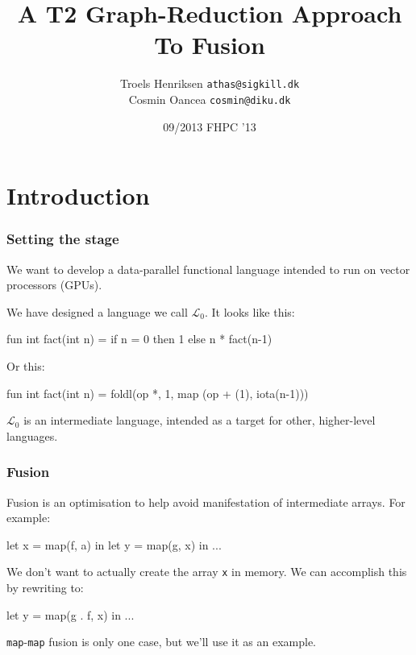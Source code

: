 \documentclass{beamer}
\title{A T2 Graph-Reduction Approach To Fusion}
\author[T.Henriksen,C.Oancea]{Troels Henriksen {\tt athas@sigkill.dk}\\Cosmin Oancea {\tt cosmin@diku.dk}}
\institute{Department of Computer Science (DIKU)\\University of Copenhagen}
\date[09/23]{09/2013 \textsc{FHPC} '13}
\newcommand{\LO}{$\mathcal{L}_0$}
\begin{document}
\titleslide

\begin{frame}[fragile]
  \tableofcontents
\end{frame}



\section{Introduction}

\begin{frame}[fragile,t]
  \frametitle{Setting the stage}

  We want to develop a data-parallel functional language intended to
  run on vector processors (GPUs).

  \pause

  We have designed a language we call \LO{}.  It looks like this:

  \begin{colorcode}
    fun int fact(int n) =
      if n = 0 then 1 else n * fact(n-1)
  \end{colorcode}

\pause

  Or this:

  \begin{colorcode}
    fun int fact(int n) =
      foldl(op *, 1, map (op + (1), iota(n-1)))
  \end{colorcode}

  \LO{} is an intermediate language, intended as a target for other,
  higher-level languages.
\end{frame}

\begin{frame}[fragile,t]
  \frametitle{Fusion}

  Fusion is an optimisation to help avoid manifestation of
  intermediate arrays.  For example:

  \begin{colorcode}
    let x = map(f, a) in
    let y = map(g, x) in
    ...
  \end{colorcode}

\pause

We don't want to actually create the array {\tt x} in memory.  We can
accomplish this by rewriting to:

  \begin{colorcode}
    let y = map(g . f, x) in
    ...
  \end{colorcode}

  {\tt map}-{\tt map} fusion is only one case, but we'll use it as an
  example.
\end{frame}
\end{document}
